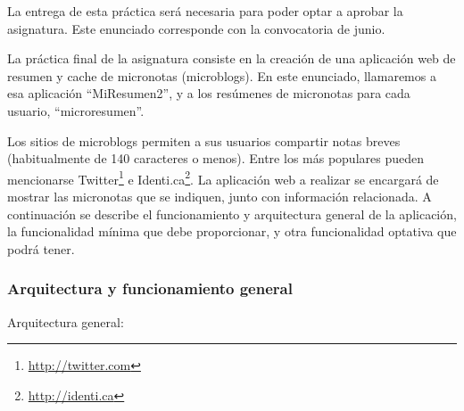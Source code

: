 La entrega de esta práctica será necesaria para poder optar a aprobar la asignatura.
 Este enunciado corresponde con la convocatoria de junio.

La práctica final de la asignatura consiste en la creación de una aplicación web de resumen y cache de micronotas (microblogs). En este enunciado, llamaremos a esa aplicación ``MiResumen2'', y a los resúmenes de micronotas para cada usuario, ``microresumen''.

Los sitios de microblogs permiten a sus usuarios compartir notas breves (habitualmente de 140 caracteres o menos). Entre los más populares pueden mencionarse Twitter\footnote{\url{http://twitter.com}} e Identi.ca\footnote{\url{http://identi.ca}}. La aplicación web a realizar se encargará de mostrar las micronotas que se indiquen, junto con información relacionada. A continuación se describe el funcionamiento y arquitectura general de la aplicación, la funcionalidad mínima que debe proporcionar, y otra funcionalidad optativa que podrá tener.

\subsubsection{Arquitectura y funcionamiento general}

Arquitectura general:

